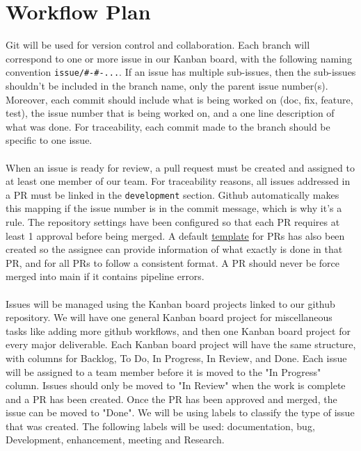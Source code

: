 \documentclass{article}
\begin{document}
\section{Workflow Plan}

Git will be used for version control and collaboration. 
Each branch will correspond to one or more issue in our Kanban board, with the following naming convention \texttt{issue/\#<issue-number1>-\#<issue-number2>-...}. 
If an issue has multiple sub-issues, then the sub-issues shouldn't be included in the branch name, only the parent issue number(s).
Moreover, each commit should include what is being worked on (doc, fix, feature, test), the issue number that is being worked on, and a one line description of what was done. 
For traceability, each commit made to the branch should be specific to one issue.\\\\

When an issue is ready for review, a pull request must be created and assigned to at least one member of our team. 
For traceability reasons, all issues addressed in a PR must be linked in the \texttt{development} section. 
Github automatically makes this mapping if the issue number is in the commit message, which is why it's a rule. 
The repository settings have been configured so that each PR requires at least 1 approval before being merged. 
A default \href{https://github.com/Team6-SixSense/audio360/blob/main/.github/pull_request_template.md}{template} for PRs has also been created so the assignee can provide information of what exactly is done in that PR, and for all PRs to follow a consistent format. 
A PR should never be force merged into main if it contains pipeline errors.\\\\

Issues will be managed using the Kanban board projects linked to our github repository. 
We will have one general Kanban board project for miscellaneous tasks like adding more github workflows, and then one Kanban board project for every major deliverable. 
Each Kanban board project will have the same structure, with columns for Backlog, To Do, In Progress, In Review, and Done. 
Each issue will be assigned to a team member before it is moved to the "In Progress" column. 
Issues should only be moved to "In Review" when the work is complete and a PR has been created. 
Once the PR has been approved and merged, the issue can be moved to "Done". 
We will be using labels to classify the type of issue that was created. 
The following labels will be used: documentation, bug, Development, enhancement, meeting and Research.
\end{document}
